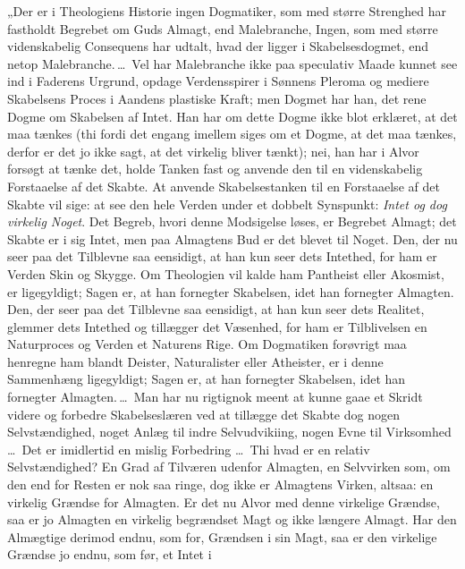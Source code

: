 \documentclass[12pt]{book}
\newcommand{\opage}[1]{\marginnote{\footnotesize\textit{[#1]}}}
\begin{document}
„Der er i Theologiens Historie ingen Dogmatiker, som
med større Strenghed har fastholdt Begrebet om Guds Almagt,
end Malebranche, Ingen, som med større videnskabelig
Consequens har udtalt, hvad der ligger i Skabelsesdogmet,
end netop Malebranche.\,\dots\ Vel har Malebranche ikke paa
speculativ Maade kunnet see ind i Faderens Urgrund, opdage
Verdensspirer i Sønnens Pleroma og mediere Skabelsens
Proces i Aandens plastiske Kraft; men Dogmet har han, det
rene Dogme om Skabelsen af Intet. Han har om dette
Dogme ikke blot erklæret, at det maa tænkes (thi fordi det engang
imellem siges om et Dogme, at det maa tænkes, derfor
er det jo ikke sagt, at det virkelig bliver tænkt); nei,
han har i Alvor forsøgt at tænke det, holde Tanken fast og
anvende den til en videnskabelig Forstaaelse af det Skabte.
\opage{162}At anvende Skabelsestanken til en Forstaaelse af det Skabte
vil sige: at see den hele Verden under et dobbelt Synspunkt:
\emph{Intet og dog virkelig Noget}. Det Begreb, hvori denne
Modsigelse løses, er Begrebet Almagt; det Skabte er i sig
Intet, men paa Almagtens Bud er det blevet til Noget.
Den, der nu seer paa det Tilblevne saa eensidigt, at han kun
seer dets Intethed, for ham er Verden Skin og Skygge. Om
Theologien vil kalde ham Pantheist eller Akosmist, er ligegyldigt;
Sagen er, at han fornegter Skabelsen, idet han fornegter
Almagten. Den, der seer paa det Tilblevne saa eensidigt,
at han kun seer dets Realitet, glemmer dets Intethed
og tillægger det Væsenhed, for ham er Tilblivelsen en Naturproces
og Verden et Naturens Rige. Om Dogmatiken forøvrigt
maa henregne ham blandt Deister, Naturalister eller
Atheister, er i denne Sammenhæng ligegyldigt; Sagen er, at
han fornegter Skabelsen, idet han fornegter Almagten.\,\dots\ Man
har nu rigtignok meent at kunne gaae et Skridt videre og
forbedre Skabelseslæren ved at tillægge det Skabte dog nogen
Selvstændighed, noget Anlæg til indre Selvudvikiing, nogen %
Evne til Virksomhed \dots\ Det er imidlertid en mislig Forbedring
\dots\ Thi hvad er en relativ Selvstændighed? En Grad
af Tilværen udenfor Almagten, en Selvvirken som, om den
end for Resten er nok saa ringe, dog ikke er Almagtens
Virken, altsaa: en virkelig Grændse for Almagten. Er det
nu Alvor med denne virkelige Grændse, saa er jo Almagten
en virkelig begrændset Magt og ikke længere Almagt. Har den
Almægtige derimod endnu, som for, Grændsen i sin Magt,
saa er den virkelige Grændse jo endnu, som før, et Intet i %
\end{document}
